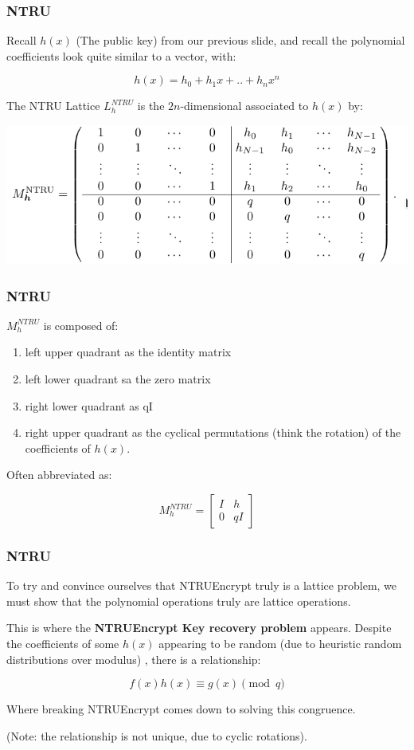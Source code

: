 \documentclass{beamer}
\begin{document}
\begin{frame}
\frametitle{NTRU}

Recall $h(x)$ (The public key) from our previous slide, and recall the polynomial coefficients look quite similar to a vector, with:

\[ h(x) = h_0 + h_1x +..+h_nx^n \]

The NTRU Lattice $L_h^{NTRU}$ is the $2n$-dimensional associated to $h(x)$ by:

\begin{center}
\includegraphics[scale=0.4]{Ntru-lattice.png}

\end{center}

\end{frame}

\begin{frame}
\frametitle{NTRU}

$M_h^{NTRU}$ is composed of:
\begin{enumerate}
\item left upper quadrant as the identity matrix
\item left lower quadrant sa the zero matrix
\item right lower quadrant as qI
\item right upper quadrant as the cyclical permutations (think the rotation) of the coefficients of $h(x)$.
\end{enumerate}

Often abbreviated as:

\[ M_h^{NTRU} = \begin{bmatrix}
I & h \\
0 & qI
\end{bmatrix} \]

\end{frame}
	
\begin{frame}
\frametitle{NTRU}
To try and convince ourselves that NTRUEncrypt truly is a lattice problem, we must show that the polynomial operations truly are lattice operations.

This is where the\textbf{ NTRUEncrypt Key recovery problem} appears. Despite the coefficients of some $h(x)$ appearing to be random (due to heuristic random distributions over modulus)	, there is a relationship:

\[ f(x)h(x) \equiv g(x) \pmod{q} \]

Where breaking NTRUEncrypt comes down to solving this congruence.

(Note: the relationship is not unique, due to cyclic rotations).

\end{frame}
	
\end{document}
